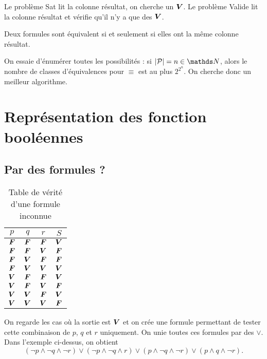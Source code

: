 Le problème {\sc Sat}\/ lit la colonne résultat, on cherche un ${\bm{V}}\/$. Le problème Valide lit la colonne résultat et vérifie qu'il n'y a que des ${\bm{V}}\/$.

\begin{rmk}
	Deux formules sont équivalent si et seulement si elles ont la même colonne résultat.
\end{rmk}

On essaie d'énumérer toutes les possibilités : si $|\mathcal{P}| = n \in \N$, alors le nombre de classes d'équivalences pour $\equiv$\/ est au plus $2^{2^n}$.
On cherche donc un meilleur algorithme.

\section{Représentation des fonction booléennes}

\subsection{Par des formules ?}

\begin{table}[H]
	\centering
	\begin{tabular}{c|c|c|c}
		$p$\/ & $q$\/ & $r$\/ & $S$\/\\[2mm]\hline
		$\bm{F}$&$\bm{F}$&$\bm{F}$&$\bm{V}$\\
		$\bm{F}$&$\bm{F}$&$\bm{V}$&$\bm{F}$\\
		$\bm{F}$&$\bm{V}$&$\bm{F}$&$\bm{F}$\\
		$\bm{F}$&$\bm{V}$&$\bm{V}$&$\bm{V}$\\
		$\bm{V}$&$\bm{F}$&$\bm{F}$&$\bm{V}$\\
		$\bm{V}$&$\bm{F}$&$\bm{V}$&$\bm{F}$\\
		$\bm{V}$&$\bm{V}$&$\bm{F}$&$\bm{V}$\\
		$\bm{V}$&$\bm{V}$&$\bm{V}$&$\bm{F}$\\
	\end{tabular}
	\caption{Table de vérité d'une formule inconnue}
\end{table}

On regarde les cas où la sortie est ${\bm{V}}$\/ et on crée une formule permettant de tester cette combinaison de $p$, $q$\/ et $r$\/ uniquement. On unie toutes ces formules par des $\lor$. Dans l'exemple ci-dessus, on obtient \[
	(\lnot p \land \lnot q \land \lnot r) \lor (\lnot p \land \lnot q \land r) \lor (p \land \lnot q \land \lnot r) \lor (p \land q \land \lnot r)
.\]

